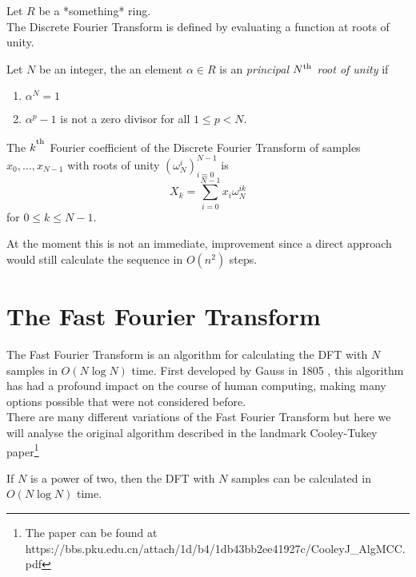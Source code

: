 Let $R$ be a *something* ring.\\

The Discrete Fourier Transform is defined by evaluating a function at roots of unity.

\begin{definition}
  Let $N$ be an integer, the an element $\alpha \in R$ is an \emph{principal $N^{\textrm{th}}$ root of unity} if
  \begin{enumerate}
    \item $\alpha^N = 1$
    \item $\alpha^p - 1$ is not a zero divisor for all $1 \leq p < N$.
  \end{enumerate}
\end{definition}


\begin{definition}
The $k^{\textsuperscript{\textup{th}}}$ Fourier coefficient of the Discrete Fourier Transform of samples $x_0, \ldots, x_{N-1}$ with roots of unity $(\omega_N^i)_{i=0}^{N-1}$ is 
\[
    X_k = \sum^{N-1}_{i=0}x_i\omega_{N}^{ik}
\]
for $0 \leq k \leq N-1$.\\
\end{definition}

At the moment this is not an immediate, improvement since a direct approach would still calculate the sequence in $O(n^2)$ steps.


\section{The Fast Fourier Transform}

The Fast Fourier Transform is an algorithm for calculating the DFT with $N$ samples in $O(N \log N)$ time. First developed by Gauss in 1805 \cite{guass}, this algorithm has had a profound impact on the course of human computing, making many options possible that were not considered before.\\
There are many different variations of the Fast Fourier Transform but here we will analyse the original algorithm described in the landmark Cooley-Tukey paper\footnote{The paper can be found at https://bbs.pku.edu.cn/attach/1d/b4/1db43bb2ee41927c/CooleyJ\_AlgMCC.pdf}\\

\begin{theorem}
    If $N$ is a power of two, then the DFT with $N$ samples can be calculated in $O(N\log N)$ time.
\end{theorem}

